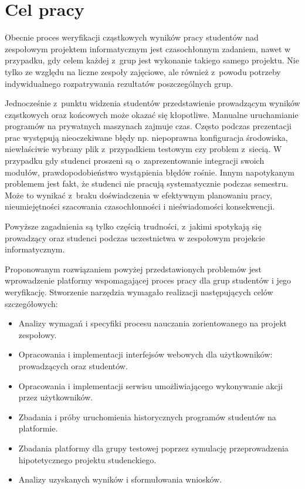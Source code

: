 \chapter{Cel pracy}

Obecnie proces weryfikacji cząstkowych wyników pracy studentów nad zespołowym projektem informatycznym jest czasochłonnym zadaniem, nawet w przypadku, gdy celem każdej z~grup jest wykonanie takiego samego projektu.
Nie tylko ze względu na liczne zespoły zajęciowe, ale również z~powodu potrzeby indywidualnego rozpatrywania rezultatów poszczególnych grup.

Jednocześnie z~punktu widzenia studentów przedstawienie prowadzącym wyników cząstkowych oraz końcowych może okazać się kłopotliwe.
Manualne uruchamianie programów na prywatnych maszynach zajmuje czas.
Często podczas prezentacji prac występują nieoczekiwane błędy np. niepoprawna konfiguracja środowiska, niewłaściwie wybrany plik z~przypadkiem testowym czy problem z~siecią.
W przypadku gdy studenci proszeni są o~zaprezentowanie integracji swoich modułów, prawdopodobieństwo wystąpienia błędów rośnie.
Innym napotykanym problemem jest fakt, że studenci nie pracują systematycznie podczas semestru.
Może to wynikać z~braku doświadczenia w efektywnym planowaniu pracy, nieumiejętności szacowania czasochłonności i nieświadomości konsekwencji.

Powyższe zagadnienia są tylko częścią trudności, z~jakimi spotykają się prowadzący oraz studenci podczas uczestnictwa w zespołowym projekcie informatycznym.

Proponowanym rozwiązaniem powyżej przedstawionych problemów jest wprowadzenie platformy wspomagającej proces pracy dla grup studentów i jego weryfikację.
Stworzenie narzędzia wymagało realizacji następujących celów szczegółowych:
\begin{itemize}
    \item Analizy wymagań i specyfiki procesu nauczania zorientowanego na projekt zespołowy.
    \item Opracowania i implementacji interfejsów webowych dla użytkowników: prowadzących oraz studentów.
    \item Opracowania i implementacji serwisu umożliwiającego wykonywanie akcji przez użytkowników.
    \item Zbadania i próby uruchomienia historycznych programów studentów na platformie.
    \item Zbadania platformy dla grupy testowej poprzez symulację przeprowadzenia hipotetycznego projektu studenckiego.
    \item Analizy uzyskanych wyników i sformułowania wniosków.
\end{itemize}

